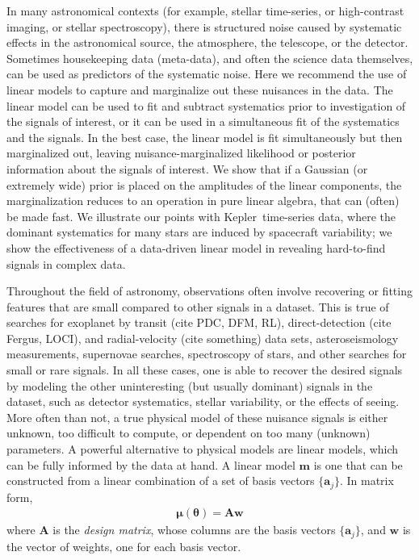 \documentclass[modern]{rnaastex}
\newcommand{\project}[1]{\textsf{#1}}
\newcommand{\kepler}{\project{Kepler}}
\newcommand{\eqlabel}[1]{\label{eq:#1}}
\newcommand{\bvec}[1]{{\ensuremath{\boldsymbol{#1}}}}
\newcommand{\mA}{\ensuremath{\bvec{A}}}
\newcommand{\vw}{\ensuremath{\bvec{w}}}
\newcommand{\vm}{\ensuremath{\bvec{\mu}(\bvec{\theta})}}
\begin{document}
In many astronomical contexts (for example, stellar time-series, or
high-contrast imaging, or stellar spectroscopy), there is structured
noise caused by systematic
effects in the astronomical source, the atmosphere, the telescope, or
the detector.
Sometimes housekeeping data (meta-data), and often the science data themselves,
can be used as predictors of the systematic noise.
Here we recommend the use of linear models to capture and marginalize
out these nuisances in the data.
The linear model can be used to fit and subtract systematics prior to
investigation of the signals of interest, or it
can be used in a simultaneous fit of the systematics and the signals.
In the best case, the linear model is fit simultaneously but then marginalized
out, leaving nuisance-marginalized likelihood or posterior information
about the signals of interest.
We show that if a Gaussian (or extremely wide) prior is placed on the
amplitudes of the linear components, the marginalization reduces to an
operation in pure linear algebra, that can (often) be made fast.
We illustrate our points with \kepler\ time-series data, where the dominant
systematics for many stars are induced by spacecraft variability;
we show the effectiveness of a data-driven linear model in revealing
hard-to-find signals in complex data.

Throughout the field of astronomy, observations often involve recovering or
fitting features that are small compared to other signals in a dataset.
This is true of searches for exoplanet by transit (cite PDC, DFM, RL),
direct-detection (cite Fergus, LOCI), and radial-velocity  (cite something)
data sets, asteroseismology measurements, supernovae searches, spectroscopy
of stars, and other searches for small or rare signals. In all these cases,
one is able to recover the desired signals by modeling the other uninteresting
(but usually dominant) signals in the dataset, such as detector systematics,
stellar variability, or the effects of seeing.
More often than not, a true physical model of these nuisance signals is either
unknown, too difficult to compute, or dependent on too many (unknown)
parameters. A powerful alternative to physical models are linear models, which
can be fully informed by the data at hand. A linear model $\bvec{m}$ is one
that can be constructed from a linear combination of a set of basis vectors
$\{\bvec{a}_j\}$. In matrix form,
%
\begin{align}
\eqlabel{linearmodel}
\vm = \mA \vw
\end{align}
%
where $\mA$ is the \emph{design matrix}, whose columns are the basis
vectors $\{\bvec{a}_j\}$, and $\vw$ is the vector of weights, one
for each basis vector.
\end{document}
